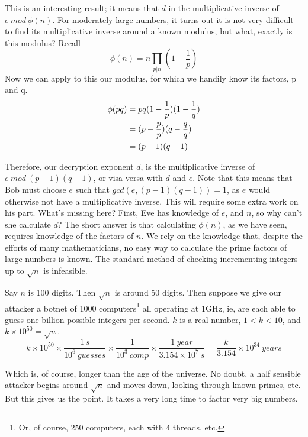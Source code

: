 \documentclass{article}
\begin{document}
        This is an interesting result; it means that $d$ in the multiplicative inverse of $e\ mod\ \phi(n)$.  
        For moderately large numbers, it turns out it is not very difficult to find its multiplicative inverse around a known modulus, but what, exactly is this modulus?  
        Recall $$\phi(n)=n\prod_{p|n}(1-\frac{1}{p})$$ 
        Now we can apply to this our modulus, for which we handily know its factors, p and q.  
        \begin{equation}
        \begin{aligned}
	        \centering
	        \phi(pq) &= pq(1-\frac{1}{p})(1-\frac{1}{q})\\
		        &= (p-\frac{p}{p})(q-\frac{q}{q})\\
		        &= (p-1)(q-1)
        \end{aligned}
        \end{equation}
        
        Therefore, our decryption exponent $d$, is the multiplicative inverse of $e\ mod\ (p-1)(q-1)$, or visa versa with $d$ and $e$.  
        Note that this means that Bob must choose $e$ such that $gcd(e,(p-1)(q-1))=1$, as $e$ would otherwise not have a multiplicative inverse.  This will require some extra work on his part.  
        What's missing here?  
        First, Eve has knowledge of $e$, and $n$, so why can't she calculate $d$?  
        The short answer is that calculating $\phi(n)$, as we have seen, requires knowledge of the factors of $n$.  
        We rely on the knowledge that, despite the efforts of many mathematicians, no easy way to calculate the prime factors of large numbers is known.  
        The standard method of checking incrementing integers up to $\sqrt{n}$ is infeasible.
        
        Say $n$ is 100 digits.  Then $\sqrt{n}$ is around 50 digits.  Then suppose we give our attacker a botnet of 1000 computers\footnote{Or, of course, 250 computers, each with 4 threads, etc.}  all operating at 1GHz, ie, are each able to guess one billion possible integers per second.  
        $k$ is a real number, $1<k<10$, and $k\times 10^{50}=\sqrt{n}$.
        $$\displaystyle k\times 10^{50} \times \frac{1\ s}{10^{6}\ guesses} \times \frac{1}{10^3\ comp}  \times \frac{1\ year}{3.154\times 10^{7}\ s} = \frac{k}{3.154} \times 10^{34}\ years$$
        
        Which is, of course, longer than the age of the universe.  No doubt, a half sensible attacker begins around $\sqrt{n}$ and moves down, looking through known primes, etc.  But this gives us the point.  It takes a very long time to factor very big numbers.
        
\end{document}
